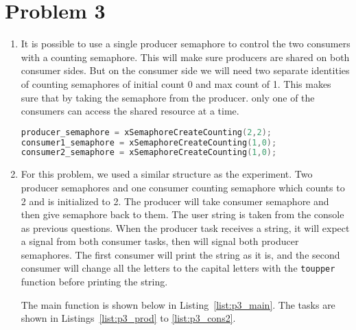 \section*{Problem 3}
\begin{enumerate}
\item
It is possible to use a single producer semaphore to control the two consumers with a counting semaphore. This will make sure producers are shared on both consumer sides. But on the consumer side we will need two separate identities of  counting semaphores of initial count 0 and max count of 1. This makes sure that by taking the semaphore from the producer. only one of the consumers can access the shared resource  at a time.
\begin{lstlisting}[language=c,caption=Problem 3.1, label=list:p3_1]
producer_semaphore = xSemaphoreCreateCounting(2,2);
consumer1_semaphore = xSemaphoreCreateCounting(1,0);
consumer2_semaphore = xSemaphoreCreateCounting(1,0);
\end{lstlisting}

\item
For this problem, we used a similar structure as the experiment. Two producer semaphores and one consumer counting semaphore which counts to 2 and is initialized to 2. The producer will take consumer semaphore and then give semaphore back to them. The user string is taken from the console as previous questions. When the producer task receives a string, it will expect a signal from both consumer tasks, then will signal both producer semaphores. The first consumer will print the string as it is, and the second consumer will change all the letters to the capital letters with the \texttt{toupper} function before printing the string.

The main function is shown below in Listing~\ref{list:p3_main}. The tasks are shown in Listings~\ref{list:p3_prod} to \ref{list:p3_cons2}.






\end{enumerate}